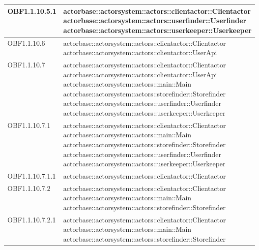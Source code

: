\documentclass{scalatekids-article}
\begin{document}
\begin{longtable}[H]{|p{4.5cm}|p{13cm}|}
  \hline
  OBF1.1.10.5.1 & \multiLineCell[t]{actorbase::actorsystem::actors::clientactor::Clientactor\\actorbase::actorsystem::actors::userfinder::Userfinder\\actorbase::actorsystem::actors::userkeeper::Userkeeper\\}\\
  \hline
  OBF1.1.10.6 & \multiLineCell[t]{actorbase::actorsystem::actors::clientactor::Clientactor\\actorbase::actorsystem::actors::clientactor::UserApi\\}\\
  \hline
  OBF1.1.10.7 & \multiLineCell[t]{actorbase::actorsystem::actors::clientactor::Clientactor\\actorbase::actorsystem::actors::clientactor::UserApi\\actorbase::actorsystem::actors::main::Main\\actorbase::actorsystem::actors::storefinder::Storefinder\\actorbase::actorsystem::actors::userfinder::Userfinder\\actorbase::actorsystem::actors::userkeeper::Userkeeper\\}\\
  \hline
  OBF1.1.10.7.1 & \multiLineCell[t]{actorbase::actorsystem::actors::clientactor::Clientactor\\actorbase::actorsystem::actors::main::Main\\actorbase::actorsystem::actors::storefinder::Storefinder\\actorbase::actorsystem::actors::userfinder::Userfinder\\actorbase::actorsystem::actors::userkeeper::Userkeeper\\}\\
  \hline
  OBF1.1.10.7.1.1 & \multiLineCell[t]{actorbase::actorsystem::actors::clientactor::Clientactor\\}\\
  \hline
  OBF1.1.10.7.2 & \multiLineCell[t]{actorbase::actorsystem::actors::clientactor::Clientactor\\actorbase::actorsystem::actors::main::Main\\actorbase::actorsystem::actors::storefinder::Storefinder\\}\\
  \hline
  OBF1.1.10.7.2.1 & \multiLineCell[t]{actorbase::actorsystem::actors::clientactor::Clientactor\\actorbase::actorsystem::actors::main::Main\\actorbase::actorsystem::actors::storefinder::Storefinder\\}\\

\end{longtable}
\end{document}
